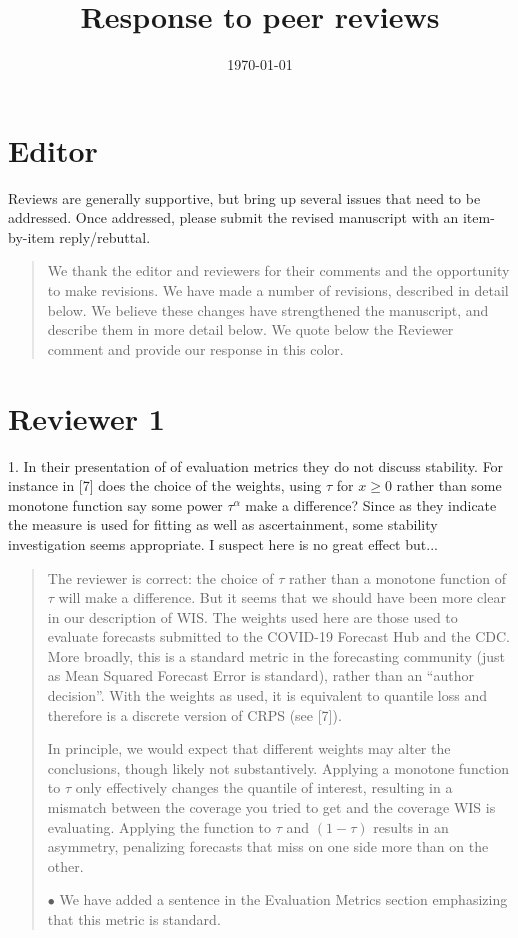 \documentclass[11pt]{article}
\title{Response to peer reviews}
\author{}
\date{\today}
\newenvironment{resp}{\begin{quote}\color{cobalt}}{\end{quote}}
\begin{document}
\maketitle


\section*{Editor}


  Reviews are generally supportive, but bring up several issues that need to be
  addressed. Once addressed, please submit the revised manuscript with an
  item-by-item reply/rebuttal.  


\begin{resp}
  We thank the editor and reviewers for their comments and the opportunity to make
  revisions. We have made a number of revisions, described in detail below.
  We believe these changes have strengthened the manuscript, and describe them in
  more detail below.
  We quote below the Reviewer comment and provide our response in this color.
\end{resp}


\section*{Reviewer 1}



  1. In their presentation of of evaluation metrics they do not discuss
  stability. For instance in [7] does the choice of the weights, using $\tau$ for
  $x\geq 0$ rather than some monotone function say some power $\tau^\alpha$ make a
  difference? Since as they indicate the measure is used for fitting as well as
  ascertainment, some stability investigation seems appropriate. I suspect here
  is no great effect but...


\begin{resp}
  The reviewer is correct: the choice of $\tau$ rather than a monotone function of
  $\tau$ will make a difference. But it seems that we should have been more clear
  in our description of WIS. The weights used here are those used to evaluate
  forecasts submitted to the COVID-19 Forecast Hub and the CDC. More broadly,
  this is a standard metric in the forecasting community (just as Mean Squared
  Forecast Error is standard), rather than an ``author decision''.  With the
  weights as used, it is equivalent to quantile loss and therefore is a discrete
  version of CRPS (see [7]).

  In principle,
  we would expect that different weights may alter the conclusions, though
  likely not substantively. Applying a monotone function to $\tau$ only effectively
  changes the quantile of interest, resulting in a mismatch between the coverage you
  tried to get and the coverage WIS is evaluating. Applying the function to $\tau$
  and $(1-\tau)$ results in an asymmetry, penalizing forecasts that miss on one
  side more than on the other.

  $\bullet$ We have added a sentence in the Evaluation Metrics section emphasizing that
  this metric is standard.
\end{resp}
\end{document}
